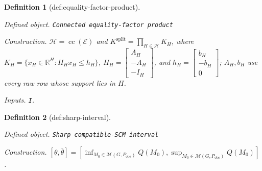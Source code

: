 \documentclass{article}
\newtheorem{definition}{Definition}
\begin{document}
\begin{definition}[def:equality-factor-product]\label{def:equality-factor-product}
\par\smallskip\noindent\emph{Defined object.} \texttt{Connected equality-\allowbreak{}factor product}
\par\smallskip\noindent\emph{Construction.} \(\mathcal H=\operatorname{cc}(\mathcal E)\) and \(K^{\mathrm{split}}=\prod_{H\in\mathcal H}K_H\), where \(K_H=\{x_H\in\mathbb R^H:H_Hx_H\le h_H\}\), \(H_H=\begin{bmatrix}A_H\\-A_H\\-I_H\end{bmatrix}\), and \(h_H=\begin{bmatrix}b_H\\-b_H\\0\end{bmatrix}\); \(A_H,b_H\) use every raw row whose support lies in \(H\).
\par\smallskip\noindent\emph{Inputs.} \texttt{I}.
\end{definition}

\begin{definition}[def:sharp-interval]\label{def:sharp-interval}
\par\smallskip\noindent\emph{Defined object.} \texttt{Sharp compatible-\allowbreak{}SCM interval}
\par\smallskip\noindent\emph{Construction.} \([\underline\theta,\overline\theta]=[\inf_{M_0\in\mathcal M(G,P_{\mathrm{obs}})}Q(M_0),\sup_{M_0\in\mathcal M(G,P_{\mathrm{obs}})}Q(M_0)]\).
\end{definition}
\end{document}
